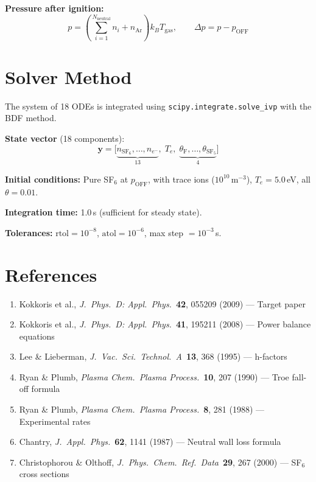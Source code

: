 \documentclass[11pt,a4paper]{article}
\begin{document}
\textbf{Pressure after ignition:}
\begin{equation}
  p = \left(\sum_{i=1}^{N_\text{neutral}} n_i + n_\text{Ar}\right) k_B T_\text{gas}, \qquad \Delta p = p - p_\text{OFF}
\end{equation}

\section{Solver Method}

The system of 18 ODEs is integrated using \texttt{scipy.integrate.solve\_ivp} with the BDF method.

\textbf{State vector} (18 components):
\begin{equation}
  \mathbf{y} = \bigl[\underbrace{n_{\text{SF}_6},\ldots,n_{e^-}}_{13}, \; T_e, \; \underbrace{\theta_\text{F},\ldots,\theta_{\text{SF}_5}}_{4}\bigr]
\end{equation}

\textbf{Initial conditions:} Pure SF$_6$ at $p_\text{OFF}$, with trace ions ($10^{10}$\,m$^{-3}$), $T_e = 5.0$\,eV, all $\theta = 0.01$.

\textbf{Integration time:} 1.0\,s (sufficient for steady state).

\textbf{Tolerances:} $\text{rtol} = 10^{-8}$, $\text{atol} = 10^{-6}$, max step $= 10^{-3}$\,s.

\section{References}

\begin{enumerate}[nosep]
  \item Kokkoris et al., \textit{J.\ Phys.\ D: Appl.\ Phys.}\ \textbf{42}, 055209 (2009) --- Target paper
  \item Kokkoris et al., \textit{J.\ Phys.\ D: Appl.\ Phys.}\ \textbf{41}, 195211 (2008) --- Power balance equations
  \item Lee \& Lieberman, \textit{J.\ Vac.\ Sci.\ Technol.\ A}\ \textbf{13}, 368 (1995) --- h-factors
  \item Ryan \& Plumb, \textit{Plasma Chem.\ Plasma Process.}\ \textbf{10}, 207 (1990) --- Troe fall-off formula
  \item Ryan \& Plumb, \textit{Plasma Chem.\ Plasma Process.}\ \textbf{8}, 281 (1988) --- Experimental rates
  \item Chantry, \textit{J.\ Appl.\ Phys.}\ \textbf{62}, 1141 (1987) --- Neutral wall loss formula
  \item Christophorou \& Olthoff, \textit{J.\ Phys.\ Chem.\ Ref.\ Data}\ \textbf{29}, 267 (2000) --- SF$_6$ cross sections
\end{enumerate}
\end{document}
